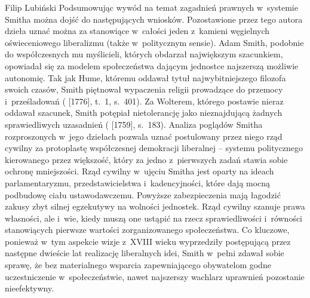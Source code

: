 \begin{artplenv}{Filip Lubiński}
Podsumowując wywód na temat zagadnień prawnych w~systemie Smitha można dojść do następujących wniosków.
Pozostawione przez tego autora dzieła uznać można za stanowiące w~całości jeden z~kamieni węgielnych oświeceniowego
liberalizmu (także w~politycznym sensie). Adam Smith, podobnie do współczesnych mu myślicieli, których obdarzał
największym szacunkiem, opowiadał się za modelem społeczeństwa dającym jednostce najszerszą możliwie autonomię. Tak jak
Hume, któremu oddawał tytuł najwybitniejszego filozofa swoich czasów, Smith piętnował wypaczenia religii prowadzące do
przemocy i~prześladowań
(\cite{smith_badania_2007} [1776], t.~1, s.~401).
Za Wolterem, którego postawie
nieraz oddawał szacunek, Smith potępiał nietolerancję jako nieznajdującą żadnych sprawiedliwych uzasadnień
(\cite{smith_teoria_1989} [1759], s.~183).
Analiza poglądów Smitha rozproszonych w~jego dziełach pozwala
uznać postulowany przez niego rząd cywilny za protoplastę współczesnej demokracji liberalnej -- systemu politycznego
kierowanego przez większość, który za jedno z~pierwszych zadań stawia sobie ochronę mniejszości. Rząd cywilny w~ujęciu
Smitha jest oparty na ideach parlamentaryzmu, przedstawicielstwa i~kadencyjności, które dają mocną podbudowę ciału
ustawodawczemu. Powyższe zabezpieczenia mają łagodzić zakusy zbyt silnej egzekutywy na wolności jednostek. Rząd cywilny
szanuje prawa własności, ale i~wie, kiedy muszą one ustąpić na rzecz sprawiedliwości i~równości stanowiących pierwsze
wartości zorganizowanego społeczeństwa. Co kluczowe, ponieważ w~tym aspekcie wizje z~XVIII wieku wyprzedziły
postępującą przez następne dwieście lat realizację liberalnych idei, Smith w~pełni zdawał sobie sprawę, że bez
materialnego wsparcia zapewniającego obywatelom godne uczestniczenie w~społeczeństwie, nawet najszerszy wachlarz
uprawnień pozostanie nieefektywny.

\end{artplenv}\label{lub-stop}
